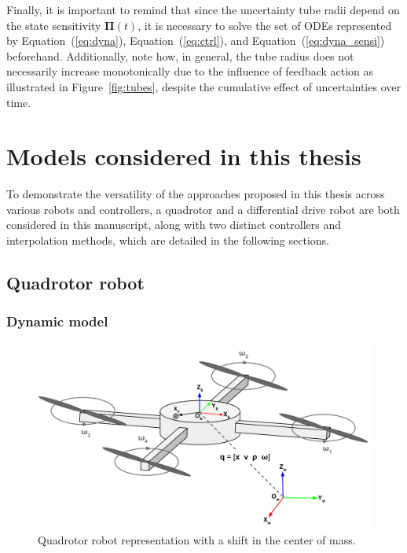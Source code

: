 Finally, it is important to remind that since the uncertainty tube radii depend on the state sensitivity $\boldsymbol{\Pi}(t)$, it is necessary to solve the set of ODEs represented by Equation~(\ref{eq:dyna}), Equation~(\ref{eq:ctrl}), and Equation~(\ref{eq:dyna_sensi}) beforehand.
Additionally, note how, in general, the tube radius does not necessarily increase monotonically due to the influence of feedback action as illustrated in Figure~\ref{fig:tubes}, despite the cumulative effect of uncertainties over time. 

\section{Models considered in this thesis}

To demonstrate the versatility of the approaches proposed in this thesis across various robots and controllers, a quadrotor and a differential drive robot are both considered in this manuscript, along with two distinct controllers and interpolation methods, which are detailed in the following sections.

\subsection{Quadrotor robot} \label{sec:quad_model}

\subsubsection{Dynamic model}

\begin{figure} [t]
    \centering
    \includegraphics[width=0.8\linewidth]{figures/models/drone.png} 
    \caption{Quadrotor robot representation with a shift in the center of mass.}%
    \label{fig:quad}%
\end{figure}

